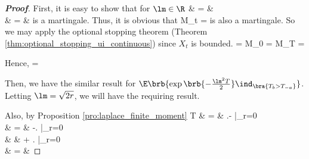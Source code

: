 \begin{proof}[\bf Proof]
First, it is easy to show that for $\lm \in \R$
\beast
\exp{}
& = & \exp{} \\
& = & \exp{}
\eeast
is a martingale. Thus, it is obvious that
\be
M_t = \exp{} \sinh{}
\ee
is also a martingale. So we may apply the optional stopping theorem (Theorem \ref{thm:optional_stopping_ui_continuous}) since $X_t$ is bounded.
\beast
\sinh{} = M_0 = \E M_T = \E{}
\eeast

Hence,
\be
\E{} = 
\ee

Then, we have the similar result for $\E\brb{\exp\brb{-\frac{\lm^2 T}{2}} \ind_{\bra{T_{b}>T_{-a}}}}$. Letting $\lm = \sqrt{2r}$, we will have the requiring result.

Also, by Proposition \ref{pro:laplace_finite_moment}%
\beast
\E T & = & \left.- \right|_{r=0} \\
& = & -\left. \right|_{r=0} \\
& & + \left. \right|_{r=0} \\
& = & 
\eeast


\end{proof}
